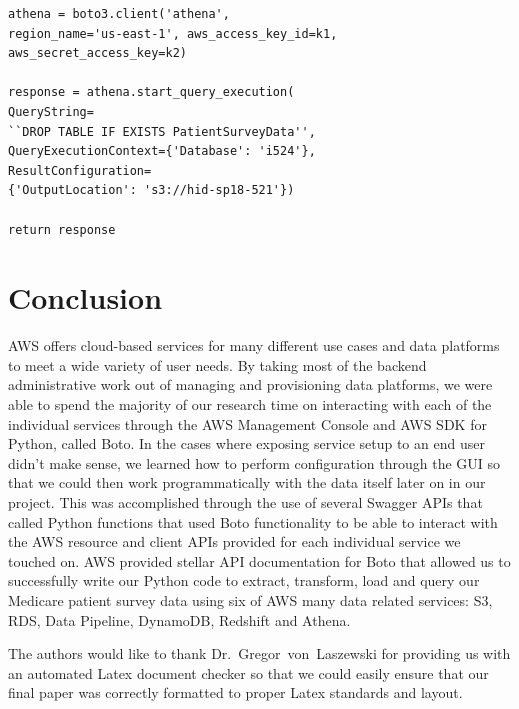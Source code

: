 \begin{verbatim}
athena = boto3.client('athena', 
region_name='us-east-1', aws_access_key_id=k1,
aws_secret_access_key=k2)

response = athena.start_query_execution(
QueryString=
``DROP TABLE IF EXISTS PatientSurveyData'',
QueryExecutionContext={'Database': 'i524'}, 
ResultConfiguration=
{'OutputLocation': 's3://hid-sp18-521'})

return response
\end{verbatim}

\section{Conclusion}

AWS offers cloud-based services for many different use cases and data 
platforms to meet a wide variety of user needs. By taking most of the backend 
administrative work out of managing and provisioning data platforms, we were 
able to spend the majority of our research time on interacting with each of 
the individual services through the AWS Management Console and AWS SDK for 
Python, called Boto. In the cases where exposing service setup to an end user 
didn't make sense, we learned how to perform configuration through the GUI so 
that we could then work programmatically with the data itself later on in our 
project. This was accomplished through the use of several Swagger APIs that 
called Python functions that used Boto functionality to be able to interact 
with the AWS resource and client APIs provided for each individual service we 
touched on. AWS provided stellar API documentation for Boto that allowed us to 
successfully write our Python code to extract, transform, load and query our 
Medicare patient survey data using six of AWS many data related services: S3, 
RDS, Data Pipeline, DynamoDB, Redshift and Athena.    

\begin{acks}
The authors would like to thank Dr.~Gregor~von~Laszewski for providing us
with an automated Latex document checker so that we could easily ensure
that our final paper was correctly formatted to proper Latex standards and 
layout.
\end{acks}


 

